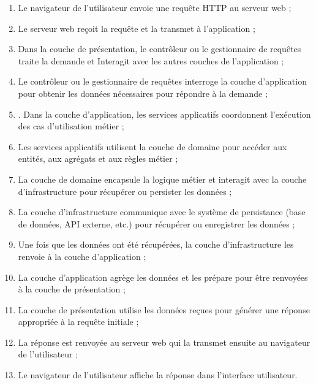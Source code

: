 \begin{enumerate}
    \item Le navigateur de l'utilisateur envoie une requête HTTP au serveur web ;

    \item Le serveur web reçoit la requête et la transmet à l'application ;

    \item Dans la couche de présentation, le contrôleur ou le gestionnaire de requêtes traite la demande et Interagit avec les autres couches de l'application ;

    \item Le contrôleur ou le gestionnaire de requêtes interroge la couche d'application pour obtenir les données nécessaires pour répondre à la demande ;
    \item. Dans la couche d'application, les services applicatifs coordonnent l'exécution des cas d'utilisation métier ;

    \item Les services applicatifs utilisent la couche de domaine pour accéder aux entités, aux agrégats et aux règles métier ;

    \item La couche de domaine encapsule la logique métier et interagit avec la couche d'infrastructure pour récupérer ou persister les données ;

    \item La couche d'infrastructure communique avec le système de persistance (base de données, API externe, etc.) pour récupérer ou enregistrer les données ;

    \item Une fois que les données ont été récupérées, la couche d'infrastructure les renvoie à la couche d'application ;

    \item La couche d'application agrège les données et les prépare pour être renvoyées à la couche de présentation ;

    \item La couche de présentation utilise les données reçues pour générer une réponse appropriée à la requête initiale ;
    \item La réponse est renvoyée au serveur web qui la transmet ensuite au navigateur de l'utilisateur ;

    \item Le navigateur de l'utilisateur affiche la réponse dans l'interface utilisateur.
\end{enumerate}


